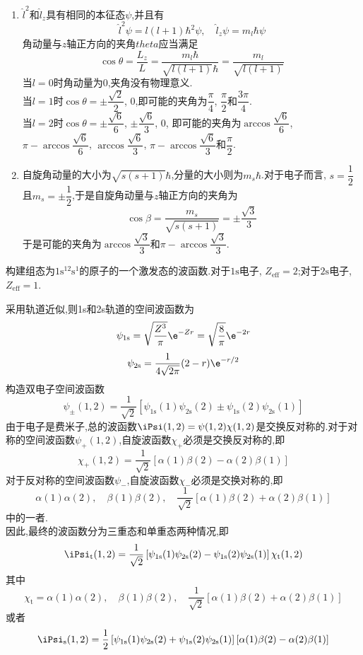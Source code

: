 \documentclass{ctexart}
\begin{document}
\begin{solution}
\begin{enumerate}[label=\tbf{(\alph*)}]
    \item $\hat{l}^2$和$\hat{l}_z$具有相同的本征态$\psi$,并且有
    \[\hat{l}^2\psi=l(l+1)\hbar^2\psi,\quad\hat{l}_z\psi=m_l\hbar\psi\]
    角动量与$z$轴正方向的夹角$theta$应当满足
    \[\cos\theta=\dfrac{L_z}{L}=\dfrac{m_l\hbar}{\sqrt{l(l+1)}\hbar}=\dfrac{m_l}{\sqrt{l(l+1)}}\]
    当$l=0$时角动量为$0$,夹角没有物理意义.\\
    当$l=1$时$\cos\theta=\pm\dfrac{\sqrt2}{2}$, $0$,即可能的夹角为$\dfrac\pi4$, $\dfrac\pi2$和$\dfrac{3\pi}{4}$.\\
    当$l=2$时$\cos\theta=\pm\dfrac{\sqrt{6}}{6}$, $\pm\dfrac{\sqrt6}{3}$, $0$, 即可能的夹角为$\arccos\dfrac{\sqrt6}{6}$, $\pi-\arccos\dfrac{\sqrt6}{6}$, $\arccos\dfrac{\sqrt6}{3}$, $\pi-\arccos\dfrac{\sqrt6}{3}$和$\dfrac\pi2$.
    \item 自旋角动量的大小为$\sqrt{s(s+1)}\hbar$,分量的大小则为$m_s\hbar$.对于电子而言, $s=\dfrac12$且$m_s=\pm\dfrac12$,于是自旋角动量与$z$轴正方向的夹角为
    \[\cos\beta=\dfrac{m_s}{\sqrt{s(s+1)}}=\pm\dfrac{\sqrt3}{3}\]
    于是可能的夹角为$\arccos\dfrac{\sqrt3}{3}$和$\pi-\arccos\dfrac{\sqrt3}{3}$.
\end{enumerate}
\end{solution}
\begin{homework}[12.]
    构建组态为$1\text{s}^12\text{s}^1$的原子的一个激发态的波函数.对于$1\text{s}$电子, $Z_{\text{eff}}=2$;对于$2\text{s}$电子, $Z_{\text{eff}}=1$.
\end{homework}
\begin{solution}
    采用轨道近似,则1s和2s轨道的空间波函数为
    \[\psi_{1\text{s}}=\sqrt{\dfrac{Z^3}{\pi}}\e^{-Zr}=\sqrt{\dfrac{8}{\pi}}\e^{-2r}\]
    \[\psi_{2\text{s}}=\dfrac{1}{4\sqrt{2\pi}}(2-r)\e^{-r/2}\]
    构造双电子空间波函数
    \[\psi_{\pm}(1,2)=\dfrac{1}{\sqrt2}\left[\psi_{1\text{s}}(1)\psi_{2\text{s}}(2)\pm\psi_{1\text{s}}(2)\psi_{2\text{s}}(1)\right]\]
    由于电子是费米子,总的波函数$\iPsi(1,2)=\psi(1,2)\chi(1,2)$是交换反对称的.对于对称的空间波函数$\psi_+(1,2)$,自旋波函数$\chi_+$必须是交换反对称的,即
    \[\chi_+(1,2)=\dfrac{1}{\sqrt2}\left[\alpha(1)\beta(2)-\alpha(2)\beta(1)\right]\]
    对于反对称的空间波函数$\psi_-$,自旋波函数$\chi_-$必须是交换对称的,即
    \[\alpha(1)\alpha(2),\quad\beta(1)\beta(2),\quad\dfrac{1}{\sqrt2}\left[\alpha(1)\beta(2)+\alpha(2)\beta(1)\right]\]
    中的一者.\\
    \indent 因此,最终的波函数分为三重态和单重态两种情况,即
    \[\iPsi_{\text{t}}(1,2)=\dfrac{1}{\sqrt2}\left[\psi_{1\text{s}}(1)\psi_{2\text{s}}(2)-\psi_{1\text{s}}(2)\psi_{2\text{s}}(1)\right]\chi_{\text{t}}(1,2)\]
    其中
    \[\chi_{\text{t}}=\alpha(1)\alpha(2),\quad\beta(1)\beta(2),\quad\dfrac{1}{\sqrt2}\left[\alpha(1)\beta(2)+\alpha(2)\beta(1)\right]\]
    或者
    \[\iPsi_{\text{s}}(1,2)=\dfrac12\left[\psi_{1\text{s}}(1)\psi_{2\text{s}}(2)+\psi_{1\text{s}}(2)\psi_{2\text{s}}(1)\right]\left[\alpha(1)\beta(2)-\alpha(2)\beta(1)\right]\]
\end{solution}
\end{document}
